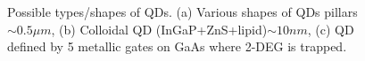 \documentclass[xcolor=pdftex,hyperref={pdfpagelabels=false},table]{beamer}
\begin{document}
\begin{frame}
\begin{columns}[T,c]
\begin{figure}
	\begin{center}
	\vspace{-5pt}
	\caption{Possible types/shapes of QDs.
	\newline (a) Various shapes of QDs pillars$\sim 0.5 \mu m$,
	\newline (b) Colloidal QD (InGaP+ZnS+lipid)$\sim 10 nm$,
	\newline (c) QD defined by 5 metallic gates on GaAs where 2-DEG is trapped.
	}%
	\vspace{-5pt}
	\end{center}
\end{figure}
\end{columns}
\end{frame}


\end{document}

